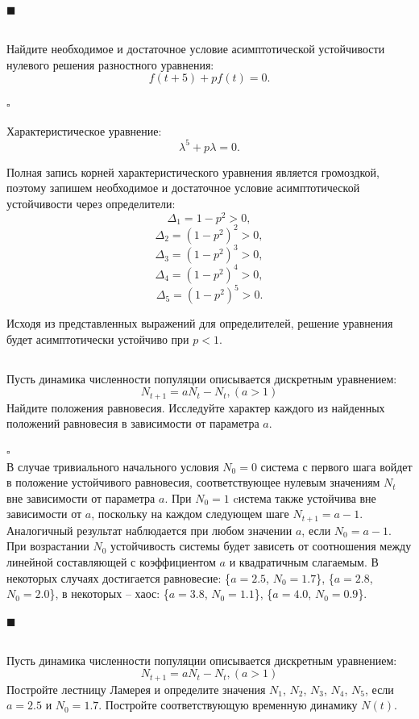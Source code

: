 \documentclass[a4paper]{article}
\newcommand{\solutionstart}{{\noindent $\square$ \\}}
\newcommand{\solutionend}{{\noindent $\blacksquare$ \\}}
\begin{document}
\solutionend


\subsection{}
Найдите необходимое и достаточное условие асимптотической устойчивости нулевого решения разностного уравнения:
\[
	f (t + 5) + p f(t) = 0.
\]

\solutionstart

Характеристическое уравнение:
\[
	\lambda^5 + p \lambda = 0.
\]

Полная запись корней характеристического уравнения является громоздкой, поэтому запишем необходимое и достаточное условие асимптотической устойчивости через определители:
\[
\Delta_1 = 1 - p^2 > 0,
\]
\[
\Delta_2 = (1 - p^2)^2 > 0,
\]
\[
\Delta_3 = (1 - p^2)^3 > 0,
\]
\[
\Delta_4 = (1 - p^2)^4 > 0,
\]
\[
\Delta_5 = (1 - p^2)^5 > 0.
\]

Исходя из представленных выражений для определителей, решение уравнения будет асимптотически устойчиво при $p < 1$.


\subsection{}
Пусть динамика численности популяции описывается дискретным уравнением:
\[
N_{t + 1} = a N_t - N_t, (a > 1)
\]
Найдите положения равновесия. Исследуйте характер каждого из найденных положений равновесия в зависимости от параметра $a$.

\solutionstart
В случае тривиального начального условия $N_0 = 0$ система с первого шага войдет в положение устойчивого равновесия, соответствующее нулевым значениям $N_t$ вне зависимости от параметра $a$. При $N_0 = 1$ cистема также устойчива вне зависимости от $a$, поскольку на каждом следующем шаге $N_{t + 1} = a - 1$. Аналогичный результат наблюдается при любом значении $a$, если $N_0 = a - 1$. При возрастании $N_0$ устойчивость системы будет зависеть от соотношения между линейной составляющей с коэффициентом $a$ и квадратичным слагаемым. В некоторых случаях достигается равновесие: \{$a = 2.5$, $N_0 = 1.7$\}, \{$a = 2.8$, $N_0 = 2.0$\}, в некоторых -- хаос: \{$a = 3.8$, $N_0 = 1.1$\}, \{$a = 4.0$, $N_0 = 0.9$\}.

\solutionend



\subsection{}
Пусть динамика численности популяции описывается дискретным уравнением:
\[
N_{t + 1} = a N_t - N_t, (a > 1)
\]
Постройте лестницу Ламерея и определите значения $N_1$, $N_2$, $N_3$, $N_4$, $N_5$, если $a = 2.5$ и $N_0 = 1.7$. Постройте соответствующую временную динамику $N(t)$.
\end{document}
